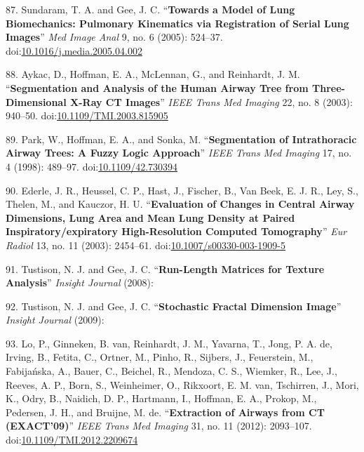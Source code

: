 \documentclass[11pt,]{article}
\begin{document}
\hypertarget{ref-Sundaram:2005aa}{}
87. Sundaram, T. A. and Gee, J. C. ``\textbf{Towards a Model of Lung
Biomechanics: Pulmonary Kinematics via Registration of Serial Lung
Images}'' \emph{Med Image Anal} 9, no. 6 (2005): 524--37.
doi:\href{https://doi.org/10.1016/j.media.2005.04.002}{10.1016/j.media.2005.04.002}

\hypertarget{ref-Aykac:2003aa}{}
88. Aykac, D., Hoffman, E. A., McLennan, G., and Reinhardt, J. M.
``\textbf{Segmentation and Analysis of the Human Airway Tree from
Three-Dimensional X-Ray CT Images}'' \emph{IEEE Trans Med Imaging} 22,
no. 8 (2003): 940--50.
doi:\href{https://doi.org/10.1109/TMI.2003.815905}{10.1109/TMI.2003.815905}

\hypertarget{ref-Park:1998aa}{}
89. Park, W., Hoffman, E. A., and Sonka, M. ``\textbf{Segmentation of
Intrathoracic Airway Trees: A Fuzzy Logic Approach}'' \emph{IEEE Trans
Med Imaging} 17, no. 4 (1998): 489--97.
doi:\href{https://doi.org/10.1109/42.730394}{10.1109/42.730394}

\hypertarget{ref-Ederle:2003aa}{}
90. Ederle, J. R., Heussel, C. P., Hast, J., Fischer, B., Van Beek, E.
J. R., Ley, S., Thelen, M., and Kauczor, H. U. ``\textbf{Evaluation of
Changes in Central Airway Dimensions, Lung Area and Mean Lung Density at
Paired Inspiratory/expiratory High-Resolution Computed Tomography}''
\emph{Eur Radiol} 13, no. 11 (2003): 2454--61.
doi:\href{https://doi.org/10.1007/s00330-003-1909-5}{10.1007/s00330-003-1909-5}

\hypertarget{ref-Tustison:2008aa}{}
91. Tustison, N. J. and Gee, J. C. ``\textbf{Run-Length Matrices for
Texture Analysis}'' \emph{Insight Journal} (2008):

\hypertarget{ref-Tustison:2009aa}{}
92. Tustison, N. J. and Gee, J. C. ``\textbf{Stochastic Fractal
Dimension Image}'' \emph{Insight Journal} (2009):

\hypertarget{ref-Lo:2012aa}{}
93. Lo, P., Ginneken, B. van, Reinhardt, J. M., Yavarna, T., Jong, P. A.
de, Irving, B., Fetita, C., Ortner, M., Pinho, R., Sijbers, J.,
Feuerstein, M., Fabijańska, A., Bauer, C., Beichel, R., Mendoza, C. S.,
Wiemker, R., Lee, J., Reeves, A. P., Born, S., Weinheimer, O., Rikxoort,
E. M. van, Tschirren, J., Mori, K., Odry, B., Naidich, D. P., Hartmann,
I., Hoffman, E. A., Prokop, M., Pedersen, J. H., and Bruijne, M. de.
``\textbf{Extraction of Airways from CT (EXACT'09)}'' \emph{IEEE Trans
Med Imaging} 31, no. 11 (2012): 2093--107.
doi:\href{https://doi.org/10.1109/TMI.2012.2209674}{10.1109/TMI.2012.2209674}
\end{document}

